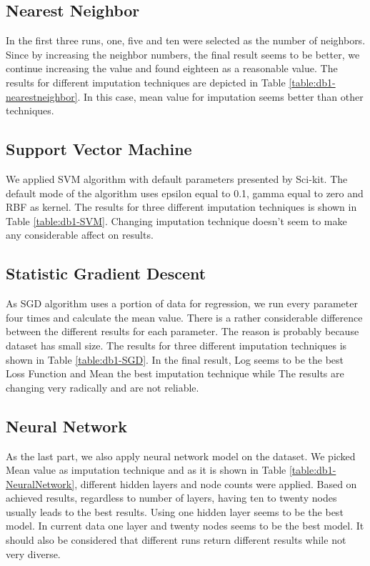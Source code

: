 \subsection{Nearest Neighbor}
In the first three runs, one, five and ten were selected as the number of neighbors. Since by increasing the neighbor numbers, the final result seems to be better, we continue increasing the value and found eighteen as a reasonable value. The results for different imputation techniques are depicted in Table \ref{table:db1-nearestneighbor}. In this case, mean value for imputation seems better than other techniques.

\subsection{Support Vector Machine}
We applied SVM algorithm with default parameters presented by Sci-kit. The default mode of the algorithm uses epsilon equal to 0.1, gamma equal to zero and RBF as kernel. The results for three different imputation techniques is shown in Table \ref{table:db1-SVM}. Changing imputation technique doesn't seem to make any considerable affect on results.

\subsection{Statistic Gradient Descent}
As SGD algorithm uses a portion of data for regression, we run every parameter four times and calculate the mean value. There is a rather considerable difference between the different results for each parameter. The reason is probably because dataset has small size. The results for three different imputation techniques is shown in Table \ref{table:db1-SGD}. In the final result, Log seems to be the best Loss Function and Mean the best imputation technique while The results are changing very radically and are not reliable.

\subsection{Neural Network}
As the last part, we also apply neural network model on the dataset. We picked Mean value as imputation technique and as it is shown in Table \ref{table:db1-NeuralNetwork}, different hidden layers and node counts were applied. Based on achieved results, regardless to number of layers, having ten to twenty nodes usually leads to the best results. Using one hidden layer seems to be the best model. In current data one layer and twenty nodes seems to be the best model. It should also be considered that different runs return different results while not very diverse.

